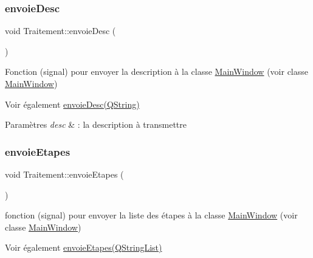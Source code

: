 \subsubsection{\texorpdfstring{envoie\+Desc}{envoieDesc}}
{\footnotesize\ttfamily void Traitement\+::envoie\+Desc (\begin{DoxyParamCaption}\item[{Q\+String}]{ }\end{DoxyParamCaption})\hspace{0.3cm}{\ttfamily [signal]}}



Fonction (signal) pour envoyer la description à la classe \hyperlink{classMainWindow}{Main\+Window} (voir classe \hyperlink{classMainWindow}{Main\+Window}) 

\begin{DoxySeeAlso}{Voir également}
\hyperlink{classTraitement_a81d1717924fb7a206df394afae4e19dc}{envoie\+Desc(\+Q\+String)} 
\end{DoxySeeAlso}

\begin{DoxyParams}{Paramètres}
{\em desc} & \+: la description à transmettre \\
\hline
\end{DoxyParams}
\mbox{\label{classTraitement_ae58a2b32e2632bfc11a696c186ace3b7}} 
\subsubsection{\texorpdfstring{envoie\+Etapes}{envoieEtapes}}
{\footnotesize\ttfamily void Traitement\+::envoie\+Etapes (\begin{DoxyParamCaption}\item[{Q\+String\+List}]{ }\end{DoxyParamCaption})\hspace{0.3cm}{\ttfamily [signal]}}



fonction (signal) pour envoyer la liste des étapes à la classe \hyperlink{classMainWindow}{Main\+Window} (voir classe \hyperlink{classMainWindow}{Main\+Window}) 

\begin{DoxySeeAlso}{Voir également}
\hyperlink{classTraitement_ae58a2b32e2632bfc11a696c186ace3b7}{envoie\+Etapes(\+Q\+String\+List)} 
\end{DoxySeeAlso}

